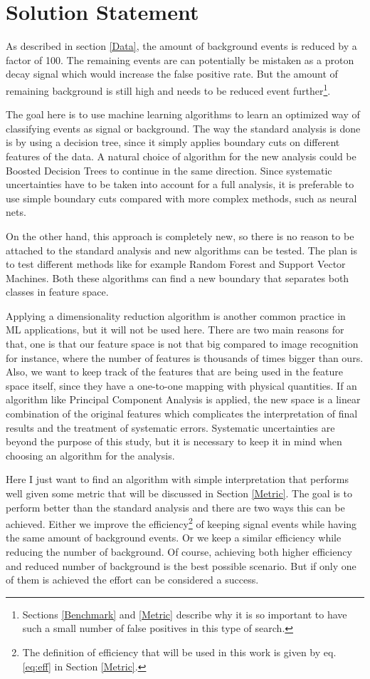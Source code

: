 
\section{Solution Statement}

As described in section \ref{Data}, the amount of background events is reduced by a factor of 100. The remaining events are can potentially be mistaken as a proton decay signal which would increase the false positive rate. But the amount of remaining background is still high and needs to be reduced event further\footnote{Sections \ref{Benchmark} and \ref{Metric} describe why it is so important to have such a small number of false positives in this type of search.}.

The goal here is to use machine learning algorithms to learn an optimized way of classifying events as signal or background. The way the standard analysis is done is by using a decision tree, since it simply applies boundary cuts on different features of the data. A natural choice of algorithm for the new analysis could be Boosted Decision Trees to continue in the same direction. Since systematic uncertainties have to be taken into account for a full analysis,  it is preferable to use simple boundary cuts compared with more complex methods, such as neural nets.

On the other hand, this approach is completely new, so there is no reason to be attached to the standard analysis and new algorithms can be tested. The plan is to test different methods like for example Random Forest and Support Vector Machines. Both these algorithms can find a new boundary that separates both classes in feature space.

Applying a dimensionality reduction algorithm is another common practice in ML applications, but it will not be used here. There are two main reasons for that, one is that our feature space is not that big compared to image recognition for instance, where the number of features is thousands of times bigger than ours. Also, we want to keep track of the features that are being used in the feature space itself, since they have a one-to-one mapping with physical quantities. If an algorithm like Principal Component Analysis is applied, the new space is a linear combination of the original features which complicates the interpretation of final results and the treatment of systematic errors. Systematic uncertainties are beyond the purpose of this study, but it is necessary to keep it in mind when choosing an algorithm for the analysis.

Here I just want to find an algorithm with simple interpretation that performs well given some metric that will be discussed in Section \ref{Metric}. The goal is to perform better than the standard analysis and there are two ways this can be achieved. Either we improve the efficiency\footnote{ The definition of efficiency that will be used in this work is given by eq. \ref{eq:eff} in Section \ref{Metric}.} of keeping signal events while having the same amount of background events. Or we keep a similar efficiency while reducing the number of background. Of course, achieving both higher efficiency and reduced number of background is the best possible scenario. But if only one of them is achieved the effort can be considered a success.
